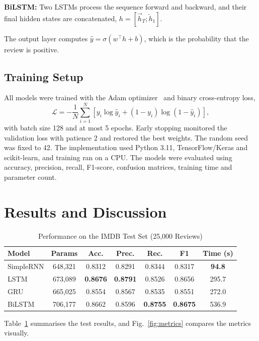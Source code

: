 \documentclass[conference]{IEEEtran}
\begin{document}
\textbf{BiLSTM:} Two LSTMs process the sequence forward and backward, and their final hidden states are concatenated, $h = [\overrightarrow{h}_T ; \overleftarrow{h}_1]$.

The output layer computes $\hat{y} = \sigma(w^\top h + b)$, which is the probability that the review is positive.

\subsection{Training Setup}
All models were trained with the Adam optimizer~\cite{kingma2015} and binary cross-entropy loss,
\begin{equation}
\mathcal{L} = -\frac{1}{N}\sum_{i=1}^{N} \left[ y_i \log \hat{y}_i + (1-y_i)\log(1-\hat{y}_i) \right],
\end{equation}
with batch size 128 and at most 5 epochs. Early stopping monitored the validation loss with patience 2 and restored the best weights. The random seed was fixed to 42. The implementation used Python 3.11, TensorFlow/Keras and scikit-learn, and training ran on a CPU. The models were evaluated using accuracy, precision, recall, F1-score, confusion matrices, training time and parameter count.

\section{Results and Discussion}

\begin{table}[htbp]
\caption{Performance on the IMDB Test Set (25,000 Reviews)}
\label{tab:results}
\centering
\setlength{\tabcolsep}{3.5pt}
\begin{tabular}{lcccccc}
\toprule
\textbf{Model} & \textbf{Params} & \textbf{Acc.} & \textbf{Prec.} & \textbf{Rec.} & \textbf{F1} & \textbf{Time (s)} \\
\midrule
SimpleRNN & 648,321 & 0.8312 & 0.8291 & 0.8344 & 0.8317 & \textbf{94.8} \\
LSTM      & 673,089 & \textbf{0.8676} & \textbf{0.8791} & 0.8526 & 0.8656 & 295.7 \\
GRU       & 665,025 & 0.8554 & 0.8567 & 0.8535 & 0.8551 & 272.0 \\
BiLSTM    & 706,177 & 0.8662 & 0.8596 & \textbf{0.8755} & \textbf{0.8675} & 536.9 \\
\bottomrule
\end{tabular}
\end{table}

Table~\ref{tab:results} summarises the test results, and Fig.~\ref{fig:metrics} compares the metrics visually.
\end{document}
